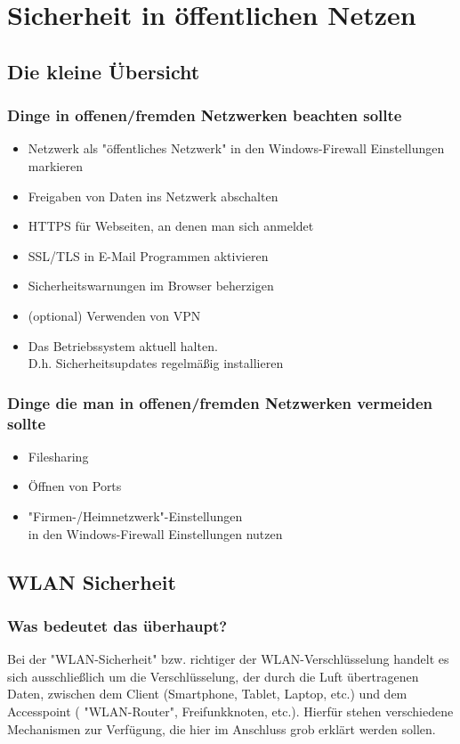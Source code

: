 \section{Sicherheit in öffentlichen Netzen}
\subsection{Die kleine Übersicht}

\subsubsection{Dinge in offenen/fremden Netzwerken beachten sollte}
\begin{itemize}
\item Netzwerk als "öffentliches Netzwerk" in den Windows-Firewall Einstellungen\\ markieren
\item Freigaben von Daten ins Netzwerk abschalten
\item HTTPS für Webseiten, an denen man sich anmeldet
\item SSL/TLS in E-Mail Programmen aktivieren
\item Sicherheitswarnungen im Browser beherzigen
\item (optional) Verwenden von VPN
\item Das Betriebssystem aktuell halten. \\D.h. Sicherheitsupdates regelmäßig installieren
\end{itemize}

\subsubsection{Dinge die man in offenen/fremden Netzwerken vermeiden sollte}

\begin{itemize}
\item Filesharing
\item Öffnen von Ports
\item "Firmen-/Heimnetzwerk"-Einstellungen \\in den Windows-Firewall Einstellungen nutzen
\end{itemize}

\subsection{WLAN Sicherheit}
\subsubsection{Was bedeutet das überhaupt?}
Bei der  "WLAN-Sicherheit"  bzw. richtiger der WLAN-Verschlüsselung handelt es 
sich ausschließlich um die Verschlüsselung, der durch die Luft übertragenen 
Daten, zwischen dem Client (Smartphone, Tablet, Laptop, etc.) und dem 
Accesspoint ( "WLAN-Router", Freifunkknoten, etc.). Hierfür stehen verschiedene 
Mechanismen zur Verfügung, die hier im Anschluss grob erklärt werden sollen.

